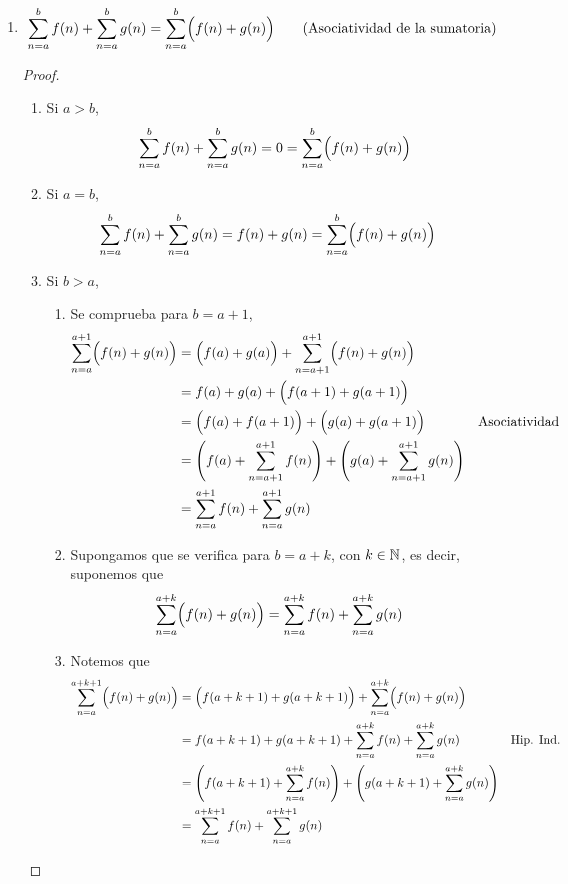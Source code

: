\begin{enumerate}[label=\alph*)]
  \item \[\sum_{n=a}^{b} f(n) + \sum_{n=a}^{b} g(n) = \sum_{n=a}^{b} \Bigl(f(n) + g(n)\Bigr) \qquad \text{(Asociatividad de la sumatoria)}\]
  \begin{proof}\leavevmode
    \begin{enumerate}[label=\Roman*)]
      \item Si $a>b$,
      \begin{align*}
        \sum_{n=a}^{b} f(n) + \sum_{n=a}^{b} g(n) = 0 = \sum_{n=a}^{b} \Bigl(f(n) + g(n)\Bigr)
      \end{align*}
      \item Si $a=b$,
      \begin{align*}
        \sum_{n=a}^{b} f(n) + \sum_{n=a}^{b} g(n) &= f(n) + g(n) = \sum_{n=a}^{b} \Bigl(f(n) + g(n)\Bigr)
      \end{align*}
      \item Si $b>a$,
      \begin{enumerate}[label=\roman*)]
        \item Se comprueba para $b=a+1$,
        \begin{align*}
          \sum_{n=a}^{a+1} \Bigl(f(n) + g(n)\Bigr) &= \Bigl(f(a) + g(a)\Bigr) + \sum_{n=a+1}^{a+1} \Bigl(f(n) + g(n)\Bigr)\\
          &= f(a) + g(a) + \Bigl(f(a+1) + g(a+1)\Bigr)\\
          &= \Bigl(f(a) + f(a+1)\Bigr) + \Bigl(g(a) + g(a+1)\Bigr) && \text{Asociatividad}\\
          &= \Biggl(f(a) + \sum_{n=a+1}^{a+1} f(n)\Biggr) + \Biggl(g(a) + \sum_{n=a+1}^{a+1} g(n)\Biggr)\\
          &= \sum_{n=a}^{a+1} f(n) + \sum_{n=a}^{a+1} g(n)
        \end{align*}
        \item Supongamos que se verifica para $b=a+k$, con $k\in \mathbb{N}$, es decir, suponemos que
        \begin{align*}
          \sum_{n=a}^{a+k} \Bigl(f(n) + g(n)\Bigr) &= \sum_{n=a}^{a+k} f(n) + \sum_{n=a}^{a+k} g(n)
        \end{align*}
        \item Notemos que
        \begin{align*}
          \sum_{n=a}^{a+k+1} \Bigl(f(n) + g(n)\Bigr) &= \Bigl(f(a+k+1) + g(a+k+1)\Bigr) + \sum_{n=a}^{a+k} \Bigl(f(n) + g(n)\Bigr)\\
          &= f(a+k+1) + g(a+k+1) + \sum_{n=a}^{a+k} f(n) + \sum_{n=a}^{a+k} g(n) && \text{Hip. Ind.}\\
          &= \Biggl(f(a+k+1) + \sum_{n=a}^{a+k} f(n)\Biggr) + \Biggl(g(a+k+1) + \sum_{n=a}^{a+k} g(n)\Biggr)\\
          &= \sum_{n=a}^{a+k+1} f(n) + \sum_{n=a}^{a+k+1} g(n)
        \end{align*}
      \end{enumerate}
    \end{enumerate}
  \end{proof}



\end{enumerate}
